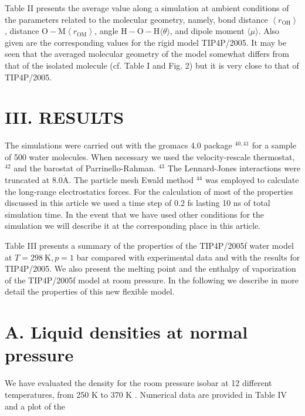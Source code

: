 \documentclass[10pt]{article}
\def\AA{\mathring{\mathrm{A}}}
\begin{document}
Table II presents the average value along a simulation at ambient conditions of the parameters related to the molecular geometry, namely, bond distance $\left\langle r_{\mathrm{OH}}\right\rangle$, distance $\mathrm{O}-\mathrm{M}\left\langle r_{\mathrm{OM}}\right\rangle$, angle $\mathrm{H}-\mathrm{O}-\mathrm{H}\langle\theta\rangle$, and dipole moment $\langle\mu\rangle$. Also given are the corresponding values for the rigid model TIP4P/2005. It may be seen that the averaged molecular geometry of the model somewhat differs from that of the isolated molecule (cf. Table I and Fig. 2) but it is very close to that of TIP4P/2005.

\section*{III. RESULTS}
The simulations were carried out with the gromacs 4.0 package ${ }^{40,41}$ for a sample of 500 water molecules. When necessary we used the velocity-rescale thermostat, ${ }^{42}$ and the barostat of Parrinello-Rahman. ${ }^{43}$ The Lennard-Jones interactions were truncated at $8.0 \AA$. The particle mesh Ewald method ${ }^{44}$ was employed to calculate the long-range electrostatics forces. For the calculation of most of the properties discussed in this article we used a time step of 0.2 fs lasting 10 ns of total simulation time. In the event that we have used other conditions for the simulation we will describe it at the corresponding place in this article.

Table III presents a summary of the properties of the TIP4P/2005f water model at $T=298 \mathrm{~K}, p=1$ bar compared with experimental data and with the results for TIP4P/2005. We also present the melting point and the enthalpy of vaporization of the TIP4P/2005f model at room pressure. In the following we describe in more detail the properties of this new flexible model.

\section*{A. Liquid densities at normal pressure}
We have evaluated the density for the room pressure isobar at 12 different temperatures, from 250 K to 370 K . Numerical data are provided in Table IV and a plot of the
\end{document}
